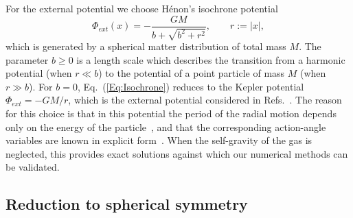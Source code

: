 For the external potential we choose H\'enon's isochrone potential~\cite{mH59,jB14,BinneyTremaine-Book}
\begin{equation}
\Phi_{ext}(x) = -\frac{GM}{b + \sqrt{b^2 + r^2}},\qquad r := |x|,
\label{Eq:Isochrone}
\end{equation}
which is generated by a spherical matter distribution of total mass $M$. The parameter $b\geq 0$ is a length scale which describes the transition from a harmonic potential (when $r\ll b$) to the potential of a point particle of mass $M$ (when $r\gg b$). For $b = 0$, Eq.~(\ref{Eq:Isochrone}) reduces to the Kepler potential $\Phi_{ext} = -GM/r$, which is the external potential considered in Refs.~\cite{mHgRmScS25,sCjL26}. The reason for this choice is that in this potential the period of the radial motion depends only on the energy of the particle~\cite{mH59,jB14}, and that the corresponding action-angle variables are known in explicit form~\cite{BinneyTremaine-Book}. When the self-gravity of the gas is neglected, this provides exact solutions against which our numerical methods can be validated.


\subsection{Reduction to spherical symmetry}
\label{SubSec:SphSym}

